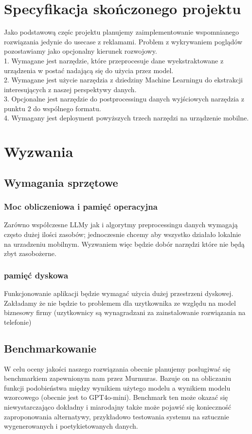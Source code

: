\documentclass[12pt]{article}
\begin{document}
\section*{Specyfikacja skończonego projektu}
Jako podstawową częśc projektu planujemy zaimplementowanie wspomnianego rozwiązania jedynie do usecase z reklamami. Problem z wykrywaniem poglądów pozostawiamy jako opcjonalny kierunek rozwojowy.\\
1. Wymagane jest narzędzie, które przeprocesuje dane wyekstraktowane z urządzenia w postać nadającą się do użycia przez model. \\
2. Wymagane jest użycie narzędzia z dziedziny Machine Learningu do ekstrakcji interesujących z naszej perspektywy danych. \\
3. Opcjonalne jest narzędzie do postprocessingu danych wyjściowych narzędzia z punktu 2 do wspólnego formatu. \\
4. Wymagany jest deployment powyższych trzech narzędzi na urządzenie mobilne.

\section*{Wyzwania}

\subsection*{Wymagania sprzętowe}
\subsubsection*{Moc obliczeniowa i pamięć operacyjna}
Zarówno współczesne LLMy jak i algorytmy preprocessingu danych wymagają często dużej ilości zasobów; jednoczesnie chcemy aby wszystko działało lokalnie na urzadzeniu mobilnym. Wyzwaniem więc będzie dobór narzędzi które nie będą zbyt zasobożerne.

\subsubsection*{pamięć dyskowa}
Funkcjonowanie aplikacji będzie wymagać użycia dużej przestrzeni dyskowej. Zakładamy że nie będzie to problemem dla uzytkownika ze względu na model biznesowy firmy (uzytkownicy są wynagradzani za zainstalowanie rozwiązania na telefonie)

\subsection*{Benchmarkowanie}
W celu oceny jakości naszego rozwiązania obecnie planujemy posługiwać się benchmarkiem zapewnionym nam przez Murmuras. Bazuje on na obliczaniu funkcji podobieństwa między wynikiem użytego modelu a wynikiem modelu wzorcowego (obecnie jest to GPT4o-mini). Benchmark ten może okazać się niewystarczająco dokładny i miarodajny także może pojawić się konieczność zaproponowania alternatywy, przykładowo testowania systemu na sztucznie wygenerowanych i poetykietowanych danych.
\end{document}
